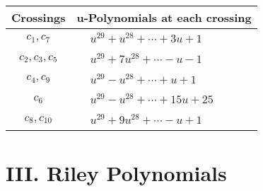 \documentclass[1p]{elsarticle_modified}
\theoremstyle{definition}
\begin{document}
\begin{tabular}{m{50pt}|m{274pt}}
Crossings & \hspace{64pt}u-Polynomials at each crossing \\
\hline $$\begin{aligned}c_{1},c_{7}\end{aligned}$$&$\begin{aligned}
&u^{29}+u^{28}+\cdots+3 u+1
\end{aligned}$\\
\hline $$\begin{aligned}c_{2},c_{3},c_{5}\end{aligned}$$&$\begin{aligned}
&u^{29}+7 u^{28}+\cdots- u-1
\end{aligned}$\\
\hline $$\begin{aligned}c_{4},c_{9}\end{aligned}$$&$\begin{aligned}
&u^{29}- u^{28}+\cdots+u+1
\end{aligned}$\\
\hline $$\begin{aligned}c_{6}\end{aligned}$$&$\begin{aligned}
&u^{29}- u^{28}+\cdots+15 u+25
\end{aligned}$\\
\hline $$\begin{aligned}c_{8},c_{10}\end{aligned}$$&$\begin{aligned}
&u^{29}+9 u^{28}+\cdots- u+1
\end{aligned}$\\
\hline
\end{tabular}\newpage\renewcommand{\arraystretch}{1}
\centering \section*{ III. Riley Polynomials}
\end{document}
